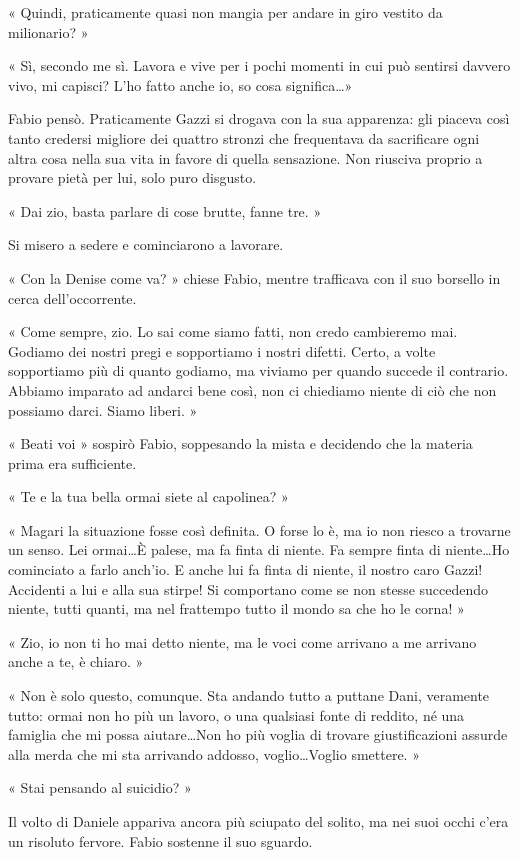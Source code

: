 « Quindi, praticamente quasi non mangia per andare in giro vestito da milionario? »

« Sì, secondo me sì. Lavora e vive per i pochi momenti in cui può sentirsi davvero vivo, mi capisci? L'ho fatto anche io, so cosa significa\ldots »

Fabio pensò. Praticamente Gazzi si drogava con la sua apparenza: gli piaceva così tanto credersi migliore dei quattro stronzi che frequentava da sacrificare ogni altra cosa nella sua vita in favore di quella sensazione. Non riusciva proprio a provare pietà per lui, solo puro disgusto.

« Dai zio, basta parlare di cose brutte, fanne tre. »

Si misero a sedere e cominciarono a lavorare.

« Con la Denise come va? » chiese Fabio, mentre trafficava con il suo borsello in cerca dell'occorrente.

« Come sempre, zio. Lo sai come siamo fatti, non credo cambieremo mai. Godiamo dei nostri pregi e sopportiamo i nostri difetti. Certo, a volte sopportiamo più di quanto godiamo, ma viviamo per quando succede il contrario. Abbiamo imparato ad andarci bene così, non ci chiediamo niente di ciò che non possiamo darci. Siamo liberi. »

« Beati voi » sospirò Fabio, soppesando la mista e decidendo che la materia prima era sufficiente.

« Te e la tua bella ormai siete al capolinea? »

« Magari la situazione fosse così definita. O forse lo è, ma io non riesco a trovarne un senso. Lei ormai\ldots È palese, ma fa finta di niente. Fa sempre finta di niente\ldots Ho cominciato a farlo anch'io. E anche lui fa finta di niente, il nostro caro Gazzi! Accidenti a lui e alla sua stirpe! Si comportano come se non stesse succedendo niente, tutti quanti, ma nel frattempo tutto il mondo sa che ho le corna! »

« Zio, io non ti ho mai detto niente, ma le voci come arrivano a me arrivano anche a te, è chiaro. »

« Non è solo questo, comunque. Sta andando tutto a puttane Dani, veramente tutto: ormai non ho più un lavoro, o una qualsiasi fonte di reddito, né una famiglia che mi possa aiutare\ldots Non ho più voglia di trovare giustificazioni assurde alla merda che mi sta arrivando addosso, voglio\ldots Voglio smettere. »

« Stai pensando al suicidio? »

Il volto di Daniele appariva ancora più sciupato del solito, ma nei suoi occhi c'era un risoluto fervore. Fabio sostenne il suo sguardo.

